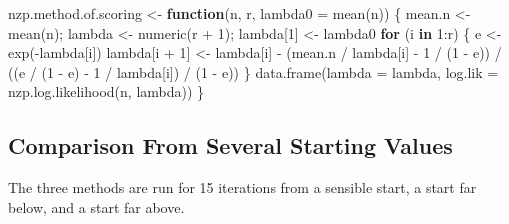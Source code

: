 \documentclass[
  letterpaper,
  DIV=11,
  numbers=noendperiod]{scrreprt}
\newenvironment{Shaded}{\begin{snugshade}}{\end{snugshade}}
\newcommand{\AttributeTok}[1]{\textcolor[rgb]{0.40,0.45,0.13}{#1}}
\newcommand{\ControlFlowTok}[1]{\textcolor[rgb]{0.00,0.23,0.31}{\textbf{#1}}}
\newcommand{\DecValTok}[1]{\textcolor[rgb]{0.68,0.00,0.00}{#1}}
\newcommand{\FloatTok}[1]{\textcolor[rgb]{0.68,0.00,0.00}{#1}}
\newcommand{\FunctionTok}[1]{\textcolor[rgb]{0.28,0.35,0.67}{#1}}
\newcommand{\NormalTok}[1]{\textcolor[rgb]{0.00,0.23,0.31}{#1}}
\newcommand{\OtherTok}[1]{\textcolor[rgb]{0.00,0.23,0.31}{#1}}
\newcommand{\SpecialCharTok}[1]{\textcolor[rgb]{0.37,0.37,0.37}{#1}}
\begin{document}
\begin{Shaded}
\begin{Highlighting}[]
\NormalTok{nzp.method.of.scoring }\OtherTok{\textless{}{-}} \ControlFlowTok{function}\NormalTok{(n, r, }\AttributeTok{lambda0 =} \FunctionTok{mean}\NormalTok{(n)) \{}
\NormalTok{  mean.n }\OtherTok{\textless{}{-}} \FunctionTok{mean}\NormalTok{(n); lambda }\OtherTok{\textless{}{-}} \FunctionTok{numeric}\NormalTok{(r }\SpecialCharTok{+} \DecValTok{1}\NormalTok{); lambda[}\DecValTok{1}\NormalTok{] }\OtherTok{\textless{}{-}}\NormalTok{ lambda0}
  \ControlFlowTok{for}\NormalTok{ (i }\ControlFlowTok{in} \DecValTok{1}\SpecialCharTok{:}\NormalTok{r) \{}
\NormalTok{    e }\OtherTok{\textless{}{-}} \FunctionTok{exp}\NormalTok{(}\SpecialCharTok{{-}}\NormalTok{lambda[i])}
\NormalTok{    lambda[i }\SpecialCharTok{+} \DecValTok{1}\NormalTok{] }\OtherTok{\textless{}{-}}\NormalTok{ lambda[i] }\SpecialCharTok{{-}}
\NormalTok{      (mean.n }\SpecialCharTok{/}\NormalTok{ lambda[i] }\SpecialCharTok{{-}} \DecValTok{1} \SpecialCharTok{/}\NormalTok{ (}\DecValTok{1} \SpecialCharTok{{-}}\NormalTok{ e)) }\SpecialCharTok{/}\NormalTok{ ((e }\SpecialCharTok{/}\NormalTok{ (}\DecValTok{1} \SpecialCharTok{{-}}\NormalTok{ e) }\SpecialCharTok{{-}} \DecValTok{1} \SpecialCharTok{/}\NormalTok{ lambda[i]) }\SpecialCharTok{/}\NormalTok{ (}\DecValTok{1} \SpecialCharTok{{-}}\NormalTok{ e))}
\NormalTok{  \}}
  \FunctionTok{data.frame}\NormalTok{(}\AttributeTok{lambda =}\NormalTok{ lambda, }\AttributeTok{log.lik =} \FunctionTok{nzp.log.likelihood}\NormalTok{(n, lambda))}
\NormalTok{\}}
\end{Highlighting}
\end{Shaded}

\subsection{Comparison From Several Starting
Values}\label{comparison-from-several-starting-values}

The three methods are run for 15 iterations from a sensible start, a
start far below, and a start far above.

\begin{Shaded}
\end{Shaded}
\end{document}
